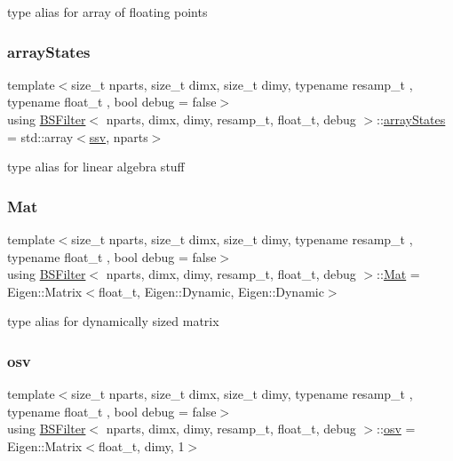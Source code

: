 type alias for array of floating points \mbox{\label{classBSFilter_a1d6f4a7ba66dda970cd6ea68a70fd641}} 
\subsubsection{\texorpdfstring{array\+States}{arrayStates}}
{\footnotesize\ttfamily template$<$size\+\_\+t nparts, size\+\_\+t dimx, size\+\_\+t dimy, typename resamp\+\_\+t , typename float\+\_\+t , bool debug = false$>$ \\
using \hyperlink{classBSFilter}{B\+S\+Filter}$<$ nparts, dimx, dimy, resamp\+\_\+t, float\+\_\+t, debug $>$\+::\hyperlink{classBSFilter_a1d6f4a7ba66dda970cd6ea68a70fd641}{array\+States} =  std\+::array$<$\hyperlink{classBSFilter_ad2341b982bcdabc798d7ed0f327d28f7}{ssv}, nparts$>$}

type alias for linear algebra stuff \mbox{\label{classBSFilter_a190a71c131060b131c11ebe2c3fefbeb}} 
\subsubsection{\texorpdfstring{Mat}{Mat}}
{\footnotesize\ttfamily template$<$size\+\_\+t nparts, size\+\_\+t dimx, size\+\_\+t dimy, typename resamp\+\_\+t , typename float\+\_\+t , bool debug = false$>$ \\
using \hyperlink{classBSFilter}{B\+S\+Filter}$<$ nparts, dimx, dimy, resamp\+\_\+t, float\+\_\+t, debug $>$\+::\hyperlink{classBSFilter_a190a71c131060b131c11ebe2c3fefbeb}{Mat} =  Eigen\+::\+Matrix$<$float\+\_\+t, Eigen\+::\+Dynamic, Eigen\+::\+Dynamic$>$}

type alias for dynamically sized matrix \mbox{\label{classBSFilter_a9a4da560f11a6e2d35ffe693de54826b}} 
\subsubsection{\texorpdfstring{osv}{osv}}
{\footnotesize\ttfamily template$<$size\+\_\+t nparts, size\+\_\+t dimx, size\+\_\+t dimy, typename resamp\+\_\+t , typename float\+\_\+t , bool debug = false$>$ \\
using \hyperlink{classBSFilter}{B\+S\+Filter}$<$ nparts, dimx, dimy, resamp\+\_\+t, float\+\_\+t, debug $>$\+::\hyperlink{classBSFilter_a9a4da560f11a6e2d35ffe693de54826b}{osv} =  Eigen\+::\+Matrix$<$float\+\_\+t, dimy, 1$>$}

